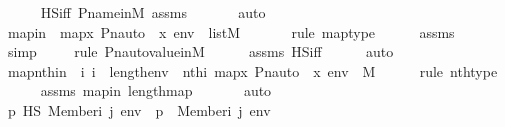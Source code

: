\begin{isabellebody}
\ \ \ \ \isamarkupfalse%
\ HS{\isacharunderscore}{\kern0pt}iff\ P{\isacharunderscore}{\kern0pt}name{\isacharunderscore}{\kern0pt}in{\isacharunderscore}{\kern0pt}M\ assms\ \isanewline
\ \ \ \ \isamarkupfalse%
\ auto\isanewline
\isanewline
\ \ \isamarkupfalse%
\ mapin\ {\isacharcolon}{\kern0pt}\ {\isachardoublequoteopen}map{\isacharparenleft}{\kern0pt}{\isasymlambda}x{\isachardot}{\kern0pt}\ Pn{\isacharunderscore}{\kern0pt}auto{\isacharparenleft}{\kern0pt}{\isasympi}{\isacharparenright}{\kern0pt}\ {\isacharbackquote}{\kern0pt}\ x{\isacharcomma}{\kern0pt}\ env{\isacharparenright}{\kern0pt}\ {\isasymin}\ list{\isacharparenleft}{\kern0pt}M{\isacharparenright}{\kern0pt}{\isachardoublequoteclose}\ \ \isanewline
\ \ \ \ \isamarkupfalse%
{\isacharparenleft}{\kern0pt}rule\ map{\isacharunderscore}{\kern0pt}type{\isacharparenright}{\kern0pt}\isanewline
\ \ \ \ \isamarkupfalse%
\ assms\ \isanewline
\ \ \ \ \ \isamarkupfalse%
\ simp\isanewline
\ \ \ \ \isamarkupfalse%
{\isacharparenleft}{\kern0pt}rule\ Pn{\isacharunderscore}{\kern0pt}auto{\isacharunderscore}{\kern0pt}value{\isacharunderscore}{\kern0pt}in{\isacharunderscore}{\kern0pt}M{\isacharparenright}{\kern0pt}\isanewline
\ \ \ \ \isamarkupfalse%
\ assms\ HS{\isacharunderscore}{\kern0pt}iff\isanewline
\ \ \ \ \isamarkupfalse%
\ auto\isanewline
\isanewline
\ \ \isamarkupfalse%
\ mapnthin\ {\isacharcolon}{\kern0pt}\ {\isachardoublequoteopen}{\isasymAnd}i{\isachardot}{\kern0pt}\ i\ {\isacharless}{\kern0pt}\ length{\isacharparenleft}{\kern0pt}env{\isacharparenright}{\kern0pt}\ {\isasymLongrightarrow}\ nth{\isacharparenleft}{\kern0pt}i{\isacharcomma}{\kern0pt}\ map{\isacharparenleft}{\kern0pt}{\isasymlambda}x{\isachardot}{\kern0pt}\ Pn{\isacharunderscore}{\kern0pt}auto{\isacharparenleft}{\kern0pt}{\isasympi}{\isacharparenright}{\kern0pt}\ {\isacharbackquote}{\kern0pt}\ x{\isacharcomma}{\kern0pt}\ env{\isacharparenright}{\kern0pt}{\isacharparenright}{\kern0pt}\ {\isasymin}\ M{\isachardoublequoteclose}\ \isanewline
\ \ \ \ \isamarkupfalse%
{\isacharparenleft}{\kern0pt}rule\ nth{\isacharunderscore}{\kern0pt}type{\isacharparenright}{\kern0pt}\isanewline
\ \ \ \ \isamarkupfalse%
\ assms\ mapin\ length{\isacharunderscore}{\kern0pt}map\ \isanewline
\ \ \ \ \isamarkupfalse%
\ auto\isanewline
\isanewline
\ \ \isamarkupfalse%
\ {\isachardoublequoteopen}p\ {\isasymtturnstile}HS\ Member{\isacharparenleft}{\kern0pt}i{\isacharcomma}{\kern0pt}\ j{\isacharparenright}{\kern0pt}\ env\ {\isasymlongleftrightarrow}\ p\ {\isasymtturnstile}\ Member{\isacharparenleft}{\kern0pt}i{\isacharcomma}{\kern0pt}\ j{\isacharparenright}{\kern0pt}\ env{\isachardoublequoteclose}\ \isanewline

\end{isabellebody}
